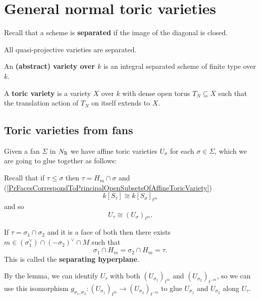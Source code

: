 \chapter{General normal toric varieties}

Recall that a scheme is \textbf{separated} if the image of the diagonal is closed.

\begin{fact}
All quasi-projective varieties are separated.
\end{fact}

\begin{definition}[]
An \textbf{(abstract) variety over $k$} is an integral separated scheme of finite type over $k$.
\end{definition}

\begin{definition}[]
A \textbf{toric variety} is a variety $X$ over $k$ with dense open torus $T_N\subseteq X$ such that the translation action of $T_N$ on itself extends to $X$.
\end{definition}

\section{Toric varieties from fans}

Given a fan $\Sigma$ in $N_{\mathbb{R}}$ we have affine toric varieties $U_\sigma$ for each $\sigma\in \Sigma$, which we are going to glue together as follows:

Recall that if $\tau\leq \sigma$ then $\tau=H_m\cap\sigma$ and (\ref{PrFacesCorrespondToPrincipalOpenSubsetsOfAffineToricVariety})
\[k[S_\tau]\cong k[S_\sigma]_{t^{m}}\]
and so
\[U_\tau\cong (U_\sigma)_{t^m}.\]

\begin{lemma}[]\label{LmSeparatingHyperplane}
If $\tau=\sigma_1\cap \sigma_2$ and it is a face of both then there exists $m\in (\sigma_1^\vee)\cap (-\sigma_2)^\vee\cap M$ such that 
\[\sigma_1\cap H_m=\sigma_2\cap H_m=\tau.\]
This is called the \textbf{separating hyperplane}.
\end{lemma}

By the lemma, we can identify $U_\tau$ with both $(U_{\sigma_1})_{t^m}$ and $(U_{\sigma_2})_{t^{-m}}$, so we can use this isomorphism $g_{\sigma_1,\sigma_2}:(U_{\sigma_1})_{t^m}\to (U_{\sigma_2})_{t^{-m}}$ to glue $U_{\sigma_1}$ and $U_{\sigma_2}$ along $U_\tau$.

